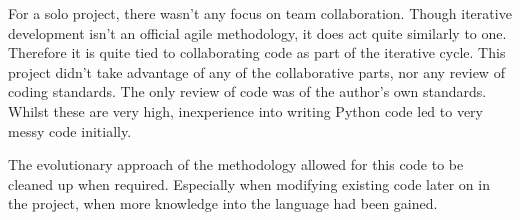 For a solo project, there wasn't any focus on team collaboration. Though iterative development 
isn't an official agile methodology, it does act quite similarly to one. Therefore it is quite 
tied to collaborating code as part of the iterative cycle. This project didn't take advantage of
any of the collaborative parts, nor any review of coding standards. The only review of code was
of the author's own standards. Whilst these are very high, inexperience into writing Python 
code led to very messy code initially.

The evolutionary approach of the methodology allowed for this code to be cleaned up when
required. Especially when modifying existing code later on in the project, when more knowledge into
the language had been gained.
